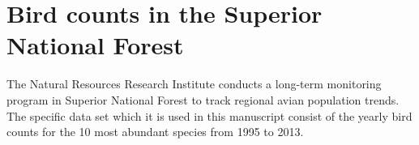 \documentclass[12pt]{article}
\newcommand{\matt}[1]{\textcolor{red}{(matt: #1)}}
\begin{document}
% 
% 
% 
% 



\section{Bird counts in the Superior National Forest \label{sec:birds}}

The Natural Resources Research Institute conducts a long-term monitoring program in Superior National Forest to track regional avian population trends. The specific data set which it is used in this manuscript consist of the yearly bird counts for the 10 most abundant species from 1995 to 2013. 
\end{document}
